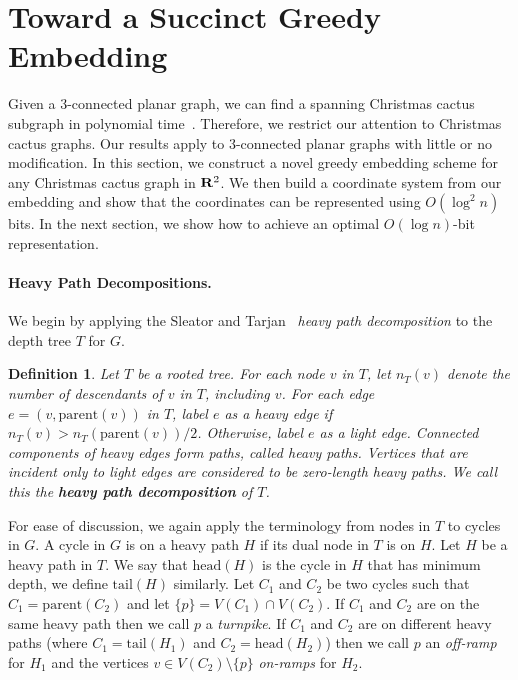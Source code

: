\documentclass[11pt]{article}
\newtheorem{definition}[theorem]{Definition}
\newcommand{\R}{{\bf R}}
\newcommand{\parent}{\mathrm{parent}}
\newcommand{\head}{\mathrm{head}}
\newcommand{\tail}{\mathrm{tail}}
\renewcommand{\subsection}[1]{\paragraph{#1.}}
\begin{document}
\section{Toward a Succinct Greedy Embedding} 
Given a 3-connected planar graph, we can find a spanning Christmas cactus
subgraph in polynomial time~\cite{lm-srgem-08}. Therefore, we restrict our
attention to Christmas cactus graphs. Our results apply to 
3-connected planar graphs with little or no modification. In this section, we construct a novel 
greedy embedding scheme for any Christmas cactus graph in $\R^2$. We 
then build a coordinate system from
our embedding and show that the coordinates can be represented using 
$O(\log^2{n})$ bits. In the next section, we show how to achieve an
optimal $O(\log{n})$-bit representation.



\subsection{Heavy Path Decompositions}

We begin by applying the Sleator and Tarjan~\cite{SleTar-JCSS-83} 
\emph{heavy path decomposition} to the depth tree $T$ for $G$.
\begin{definition} Let $T$ be a rooted tree. For each node $v$ in $T$, 
let $n_{T}(v)$ denote the number of descendants of $v$ in $T$, including $v$. 
For each edge $e = (v,\parent(v))$ in $T$, label $e$ as a heavy edge 
if $n_{T}(v) > n_{T}(\parent(v))/2$. Otherwise, label $e$ as a light edge. 
Connected components of heavy edges form paths, called heavy paths. 
Vertices that are incident only to light edges are considered to be 
zero-length heavy paths. We call this the 
{\bfseries heavy path decomposition} of $T$.
\end{definition}
For ease of discussion, we again apply the terminology from nodes in $T$ to
cycles in $G$. A cycle in $G$ is on a heavy path $H$ if its dual node in $T$
is on $H$. Let $H$ be a heavy path in $T$. We say that $\head(H)$ is the 
cycle in $H$ that has minimum depth, we define $\tail(H)$ similarly. 
Let $C_1$ and $C_2$ be two cycles such that $C_1 = \parent(C_2)$ and let 
$\{p\} = V(C_1) \cap V(C_2)$.
If $C_1$ and $C_2$ are on the same heavy path then we call $p$ a \emph{turnpike}.
If $C_1$ and $C_2$ are on different heavy paths (where $C_1=\tail(H_1)$ and 
$C_2 = \head(H_2)$) then we call $p$ an \emph{off-ramp} for $H_1$ and the vertices 
$v\in V(C_2) \setminus \{p\}$ \emph{on-ramps} for $H_{2}$. 
\end{document}
